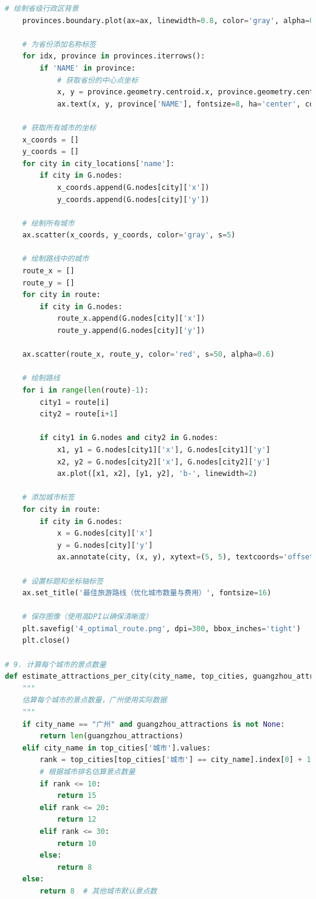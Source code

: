 \documentclass[withoutpreface,bwprint]{cumcmthesis} %
\begin{document}
\begin{appendices}
\begin{lstlisting}[language=python]
    # 绘制省级行政区背景
    provinces.boundary.plot(ax=ax, linewidth=0.8, color='gray', alpha=0.5)
    
    # 为省份添加名称标签
    for idx, province in provinces.iterrows():
        if 'NAME' in province:
            # 获取省份的中心点坐标
            x, y = province.geometry.centroid.x, province.geometry.centroid.y
            ax.text(x, y, province['NAME'], fontsize=8, ha='center', color='gray', alpha=0.7)
    
    # 获取所有城市的坐标
    x_coords = []
    y_coords = []
    for city in city_locations['name']:
        if city in G.nodes:
            x_coords.append(G.nodes[city]['x'])
            y_coords.append(G.nodes[city]['y'])
    
    # 绘制所有城市
    ax.scatter(x_coords, y_coords, color='gray', s=5)
    
    # 绘制路线中的城市
    route_x = []
    route_y = []
    for city in route:
        if city in G.nodes:
            route_x.append(G.nodes[city]['x'])
            route_y.append(G.nodes[city]['y'])
    
    ax.scatter(route_x, route_y, color='red', s=50, alpha=0.6)
    
    # 绘制路线
    for i in range(len(route)-1):
        city1 = route[i]
        city2 = route[i+1]
        
        if city1 in G.nodes and city2 in G.nodes:
            x1, y1 = G.nodes[city1]['x'], G.nodes[city1]['y']
            x2, y2 = G.nodes[city2]['x'], G.nodes[city2]['y']
            ax.plot([x1, x2], [y1, y2], 'b-', linewidth=2)
    
    # 添加城市标签
    for city in route:
        if city in G.nodes:
            x = G.nodes[city]['x']
            y = G.nodes[city]['y']
            ax.annotate(city, (x, y), xytext=(5, 5), textcoords='offset points', fontsize=10)
    
    # 设置标题和坐标轴标签
    ax.set_title('最佳旅游路线（优化城市数量与费用）', fontsize=16)
    
    # 保存图像（使用高DPI以确保清晰度）
    plt.savefig('4_optimal_route.png', dpi=300, bbox_inches='tight')
    plt.close()

# 9. 计算每个城市的景点数量
def estimate_attractions_per_city(city_name, top_cities, guangzhou_attractions=None):
    """
    估算每个城市的景点数量，广州使用实际数据
    """
    if city_name == "广州" and guangzhou_attractions is not None:
        return len(guangzhou_attractions)
    elif city_name in top_cities['城市'].values:
        rank = top_cities[top_cities['城市'] == city_name].index[0] + 1
        # 根据城市排名估算景点数量 
        if rank <= 10:
            return 15
        elif rank <= 20:
            return 12
        elif rank <= 30:
            return 10
        else:
            return 8
    else:
        return 8  # 其他城市默认景点数


\end{lstlisting}
\end{appendices}
\end{document}
